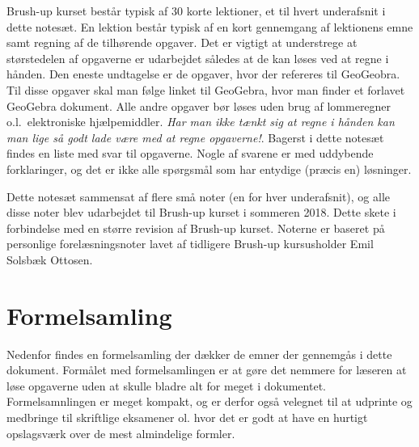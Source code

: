 Brush-up kurset består typisk af 30 korte lektioner, et til hvert underafsnit i dette notesæt. En lektion består typisk af en kort gennemgang af lektionens emne samt regning af de tilhørende opgaver. Det er vigtigt at understrege at størstedelen af opgaverne er udarbejdet således at de kan løses ved at regne i hånden. Den eneste undtagelse er de opgaver, hvor der refereres til GeoGeobra. Til disse opgaver skal man følge linket til GeoGebra, hvor man finder et forlavet GeoGebra dokument. Alle andre opgaver bør løses uden brug af lommeregner o.l.\ elektroniske hjælpemiddler. \emph{Har man ikke tænkt sig at regne i hånden kan man lige så godt lade være med at regne opgaverne!}. Bagerst i dette notesæt findes en liste med svar til opgaverne. Nogle af svarene er med uddybende forklaringer, og det er ikke alle spørgsmål som har entydige (præcis en) løsninger.

Dette notesæt sammensat af flere små noter (en for hver underafsnit), og alle disse noter blev udarbejdet til Brush-up kurset i sommeren 2018. Dette skete i forbindelse med en større revision af Brush-up kurset. Noterne er baseret på personlige forelæsningsnoter lavet af tidligere Brush-up kursusholder Emil Solsbæk Ottosen. 


\pagestyle{fancy}
\chapter{Formelsamling}
Nedenfor findes en formelsamling der dækker de emner der gennemgås i dette dokument. Formålet med formelsamlingen er at gøre det nemmere for læseren at løse opgaverne uden at skulle bladre alt for meget i dokumentet. Formelsamnlingen er meget kompakt, og er derfor også velegnet til at udprinte og medbringe til skriftlige eksamener ol. hvor det er godt at have en hurtigt opslagsværk over de mest almindelige formler. 
{ 
    \fontsize{8pt}{0.5pt}\selectfont
    \setlength{\abovedisplayskip}{1pt}
    \setlength{\belowdisplayskip}{1pt}
    \pagestyle{empty}
    \setlength{\parindent}{0pt}
    \small
    \begin{multicols*}{3}
        
        
        
        
        
        
        
    \end{multicols*}
    }
\restoregeometry
{}
% 
% 

